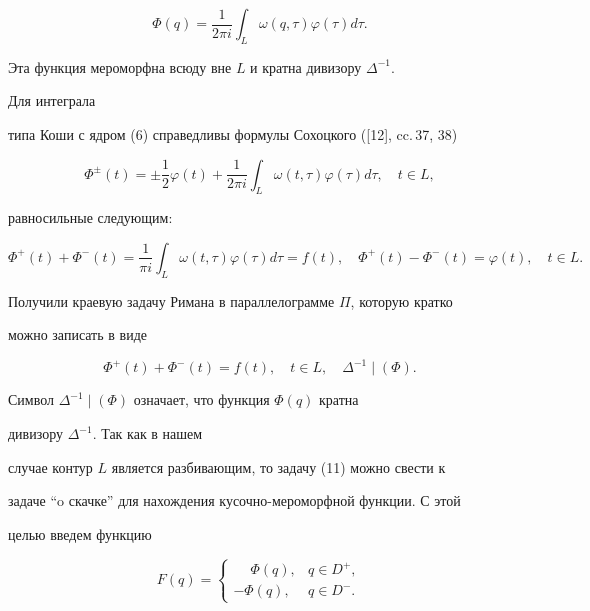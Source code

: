\begin{equation} 


\Phi(q)=\frac{1}{2\pi i}\int_L \omega(q,\tau)\varphi(\tau)d\tau. 


\end{equation} 


Эта функция мероморфна всюду вне $L$ и кратна дивизору $\Delta^{-1}$. 


Для интеграла 


типа Коши с ядром (6) справедливы формулы Сохоцкого ([12], cc.\,37, 38) 


$$ 


\Phi^\pm(t)=\pm\frac{1}{2}\varphi(t)+\frac{1}{2\pi i}\int_L 


\omega(t,\tau)\varphi(\tau)d\tau,\quad t\in L,


$$ 


равносильные следующим: 


\begin{equation} 


\Phi^+(t)+\Phi^-(t)=\frac{1}{\pi i}\int_L 


\omega(t,\tau)\varphi(\tau)d\tau=f(t),\quad 


\Phi^+(t)-\Phi^-(t)=\varphi(t),\quad t\in L. 


\end{equation} 


Получили краевую задачу Римана в параллелограмме $\Pi$, которую кратко 


можно записать в виде 


\begin{equation} 


\Phi^+(t)+\Phi^-(t)=f(t),\quad t\in L,\quad 


\Delta^{-1}\mid(\Phi). 


\end{equation} 


Символ $\Delta^{-1}\mid(\Phi)$ означает, что функция $\Phi(q)$ кратна 


дивизору $\Delta^{-1}$. Так как в нашем 


случае контур $L$ является разбивающим, то задачу (11) можно свести к 


задаче ``o скачке'' для нахождения кусочно-мероморфной функции. С этой 


целью введем функцию 


\begin{equation} 


F(q)= 


\begin{cases} 


\phantom{-}\Phi(q),& q\in D^+,\\ 


-\Phi(q),& q\in D^-. 


\end{cases}


\end{equation} 


